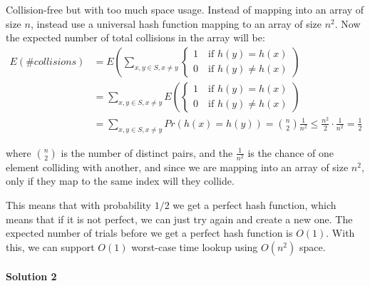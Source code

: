                 Collision-free but with too much space usage.
                Instead of mapping into an array of size $n$, instead use a universal hash function mapping to an array of size $n^2$.
                Now the expected number of total collisions in the array will be:
                \begin{align*}
                    E(\#collisions)
                    &= E\left( \sum_{x,y \in S, x \not = y}
                        \begin{cases}
                            1 \quad \text{if } h(y) = h(x) \\
                            0 \quad \text{if } h(y) \not = h(x)
                        \end{cases}
                        \right) \\
                    &= \sum_{x,y \in S, x \not = y} E\left(
                        \begin{cases}
                            1 \quad \text{if } h(y) = h(x) \\
                            0 \quad \text{if } h(y) \not = h(x)
                        \end{cases}
                        \right) \\
                    &= \sum_{x, y \in S, x \not = y} Pr(h(x) = h(y)) = \binom{n}{2} \frac{1}{n^2} \leq \frac{n^2}{2} \cdot \frac{1}{n^2} = \frac{1}{2}
                \end{align*}

                where $\binom{n}{2}$ is the number of distinct pairs, and the $\frac{1}{n^2}$ is the chance of one element colliding with another, and since we are mapping into an array of size $n^2$, only if they map to the same index will they collide.

                This means that with probability $1/2$ we get a perfect hash function, which means that if it is not perfect, we can just try again and create a new one.
                The expected number of trials before we get a perfect hash function is $O(1)$.
                With this, we can support $O(1)$ worst-case time lookup using $O(n^2)$ space.

            \paragraph{Solution 2}

